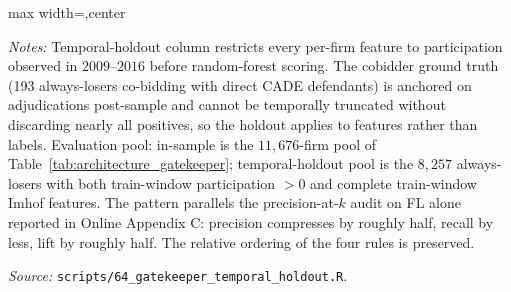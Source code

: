 \begin{table}[htbp]
\begin{adjustbox}{max width=\textwidth,center}
\begin{threeparttable}
\begin{tablenotes}
\item \textit{Notes:} Temporal-holdout column restricts every per-firm feature to participation observed in $2009$--$2016$ before random-forest scoring. The cobidder ground truth (193 always-losers co-bidding with direct CADE defendants) is anchored on adjudications post-sample and cannot be temporally truncated without discarding nearly all positives, so the holdout applies to features rather than labels. Evaluation pool: in-sample is the $11{,}676$-firm pool of Table~\ref{tab:architecture_gatekeeper}; temporal-holdout pool is the $8{,}257$ always-losers with both train-window participation $>0$ and complete train-window Imhof features. The pattern parallels the precision-at-$k$ audit on FL alone reported in Online Appendix C: precision compresses by roughly half, recall by less, lift by roughly half. The relative ordering of the four rules is preserved.
\item \textit{Source:} \texttt{scripts/64\_gatekeeper\_temporal\_holdout.R}.
\end{tablenotes}
\end{threeparttable}
\end{adjustbox}
\end{table}
